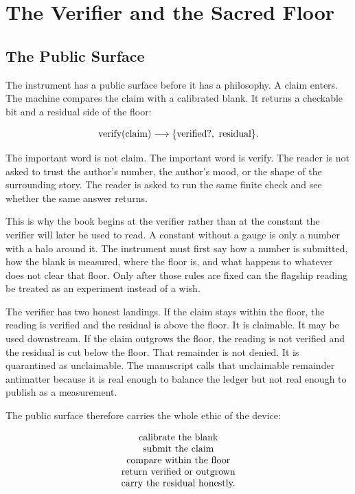 \chapter{The Verifier and the Sacred Floor}
\label{chap:verifier-sacred-floor}

\section{The Public Surface}

The instrument has a public surface before it has a philosophy. A claim
enters. The machine compares the claim with a calibrated blank. It returns a
checkable bit and a residual side of the floor:

\[
\hbox{verify}(\hbox{claim})
  \longrightarrow
  \{\hbox{verified?},\ \hbox{residual}\}.
\]

The important word is not claim. The important word is verify. The reader is
not asked to trust the author's number, the author's mood, or the shape of the
surrounding story. The reader is asked to run the same finite check and see
whether the same answer returns.

This is why the book begins at the verifier rather than at the constant the
verifier will later be used to read. A constant without a gauge is only a
number with a halo around it. The instrument must first say how a number is
submitted, how the blank is measured, where the floor is, and what happens to
whatever does not clear that floor. Only after those rules are fixed can the
flagship reading be treated as an experiment instead of a wish.

The verifier has two honest landings. If the claim stays within the floor, the
reading is verified and the residual is above the floor. It is claimable. It
may be used downstream. If the claim outgrows the floor, the reading is not
verified and the residual is cut below the floor. That remainder is not denied.
It is quarantined as unclaimable. The manuscript calls that unclaimable
remainder antimatter because it is real enough to balance the ledger but not
real enough to publish as a measurement.

The public surface therefore carries the whole ethic of the device:

\[
\begin{array}{c}
\hbox{calibrate the blank}\\
\hbox{submit the claim}\\
\hbox{compare within the floor}\\
\hbox{return verified or outgrown}\\
\hbox{carry the residual honestly.}
\end{array}
\]

